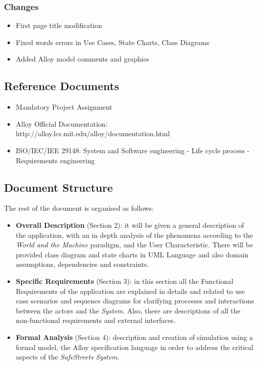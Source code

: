 \documentclass {article}
\begin{document}
		\subsubsection{Changes}
		\begin{itemize}
			\item First page title modification
			\item Fixed words errors in Use Cases, State Charts, Class Diagrams
			\item Added Alloy model comments and graphics
		\end{itemize}
	
		\subsection{Reference Documents}
		
		\begin{itemize}
			 \item Mandatory Project Assignment
			 \item Alloy Official Documentation: http://alloy.lcs.mit.edu/alloy/documentation.html
			 \item ISO/IEC/IEE 29148: System and Software engineering - Life cycle process - Requirements engineering
		\end{itemize}

	\subsection{Document Structure}
			The rest of the document is organised as follows:
				\begin{itemize}
					\item {\bf Overall Description} (Section 2): it will be given a general description of the application, with an in depth analysis of the phenomena according to the {\it World and the Machine} paradigm, and the User Characteristic. There will be provided class diagram and state charts in UML Language and also domain assumptions, dependencies and constraints.
					\item {\bf Specific Requirements} (Section 3): in this section all the Functional Requirements of the application are explained in details and related to use case scenarios and sequence diagrams for clarifying processes and interactions between the actors and the {\it System}. Also, there are descriptions of all the non-functional requirements and external interfaces.
					\item {\bf Formal Analysis} (Section 4): description and creation of simulation using a formal model, the Alloy specification language in order to address the critical aspects of the {\it SafeStreets System}.				
					\end{itemize}
\end{document}
